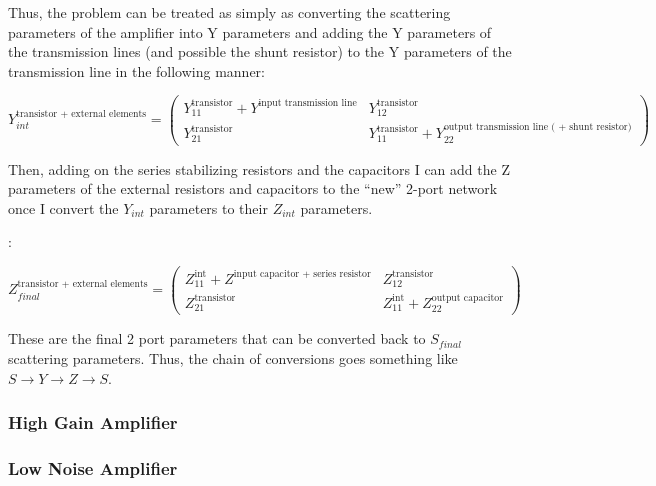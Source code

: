 Thus, the problem can be treated as simply as converting the scattering
parameters of the amplifier into Y parameters and adding the Y parameters of the
transmission lines (and possible the shunt resistor) to the Y parameters of the
transmission line in the following manner:

\[ 
    Y_{int}^{\text{transistor + external elements}} = \begin{pmatrix}
        Y_{11}^{\text{transistor}} + Y^{\text{input transmission line}} &
        Y_{12}^{\text{transistor}} \\
        Y_{21}^{\text{transistor}} & Y_{11}^{\text{transistor}} +
        Y_{22}^{\text{output transmission line ( + shunt resistor)}}
    \end{pmatrix} 
\]

Then, adding on the series stabilizing resistors and the capacitors I can add
the Z parameters of the external resistors and capacitors to the ``new'' 2-port
network once I convert the $Y_{int}$ parameters to their $Z_{int}$ parameters.

:

\[ 
    Z_{final}^{\text{transistor + external elements}} = \begin{pmatrix}
        Z_{11}^{\text{int}} + Z^{\text{input capacitor + series resistor}} &
        Z_{12}^{\text{transistor}} \\
        Z_{21}^{\text{transistor}} & Z_{11}^{\text{int}} +
        Z_{22}^{\text{output capacitor}}
    \end{pmatrix} 
\]

These are the final 2 port parameters that can be converted back to $S_{final}$
scattering parameters. Thus, the chain of conversions goes something like $S
\rightarrow Y \rightarrow Z \rightarrow S$.

\subsubsection{High Gain Amplifier}

 

\subsubsection{Low Noise Amplifier}

 
